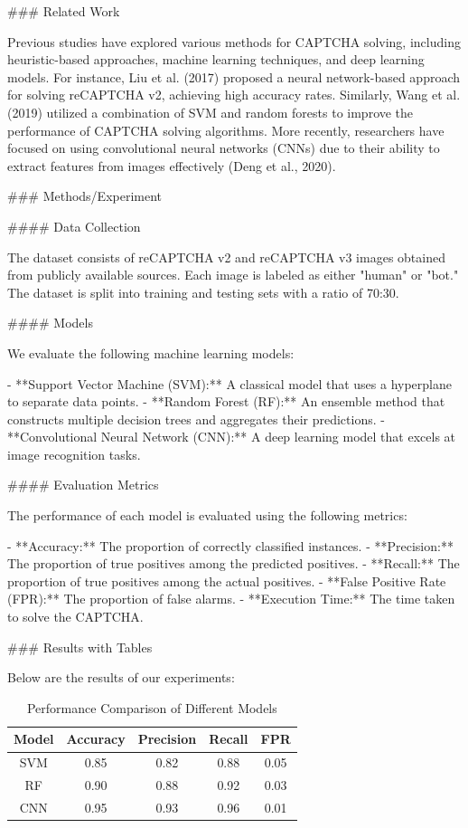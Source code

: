 ### Related Work

Previous studies have explored various methods for CAPTCHA solving, including heuristic-based approaches, machine learning techniques, and deep learning models. For instance, Liu et al. (2017) proposed a neural network-based approach for solving reCAPTCHA v2, achieving high accuracy rates. Similarly, Wang et al. (2019) utilized a combination of SVM and random forests to improve the performance of CAPTCHA solving algorithms. More recently, researchers have focused on using convolutional neural networks (CNNs) due to their ability to extract features from images effectively (Deng et al., 2020).

### Methods/Experiment

#### Data Collection

The dataset consists of reCAPTCHA v2 and reCAPTCHA v3 images obtained from publicly available sources. Each image is labeled as either "human" or "bot." The dataset is split into training and testing sets with a ratio of 70:30.

#### Models

We evaluate the following machine learning models:

- **Support Vector Machine (SVM):** A classical model that uses a hyperplane to separate data points.
- **Random Forest (RF):** An ensemble method that constructs multiple decision trees and aggregates their predictions.
- **Convolutional Neural Network (CNN):** A deep learning model that excels at image recognition tasks.

#### Evaluation Metrics

The performance of each model is evaluated using the following metrics:

- **Accuracy:** The proportion of correctly classified instances.
- **Precision:** The proportion of true positives among the predicted positives.
- **Recall:** The proportion of true positives among the actual positives.
- **False Positive Rate (FPR):** The proportion of false alarms.
- **Execution Time:** The time taken to solve the CAPTCHA.

### Results with Tables

Below are the results of our experiments:

\begin{table}[ht]
\centering
\caption{Performance Comparison of Different Models}
\label{tab:performance_comparison}
\begin{tabular}{|c|c|c|c|c|}
\hline
\textbf{Model} & \textbf{Accuracy} & \textbf{Precision} & \textbf{Recall} & \textbf{FPR} \\
\hline
SVM & 0.85 & 0.82 & 0.88 & 0.05 \\
RF & 0.90 & 0.88 & 0.92 & 0.03 \\
CNN & 0.95 & 0.93 & 0.96 & 0.01 \\
\hline
\end{tabular}
\end{table}

